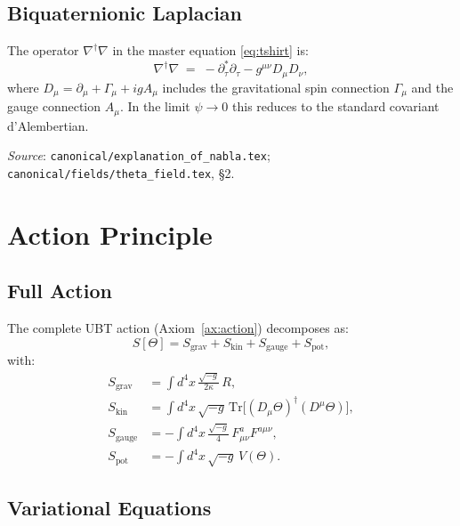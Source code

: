 \documentclass[12pt,a4paper]{article}
\begin{document}
\subsection{Biquaternionic Laplacian}

The operator $\nabla^\dagger\nabla$ in the master equation \eqref{eq:tshirt} is:
\begin{equation}
  \nabla^\dagger\nabla \;=\;
  -\partial_\tau^*\partial_\tau - g^{\mu\nu}D_\mu D_\nu,
\end{equation}
where $D_\mu = \partial_\mu + \Gamma_\mu + igA_\mu$ includes the gravitational
spin connection $\Gamma_\mu$ and the gauge connection $A_\mu$.
In the limit $\psi \to 0$ this reduces to the standard covariant d'Alembertian.

\textit{Source}: \texttt{canonical/explanation\_of\_nabla.tex};
\texttt{canonical/fields/theta\_field.tex}, \S2.

\section{Action Principle}
\label{sec:action}

\subsection{Full Action}

The complete UBT action (Axiom~\ref{ax:action}) decomposes as:
\begin{equation}
  S[\Theta] = S_{\mathrm{grav}} + S_{\mathrm{kin}} + S_{\mathrm{gauge}} + S_{\mathrm{pot}},
\end{equation}
with:
\begin{align}
  S_{\mathrm{grav}} &= \int d^4x\,\frac{\sqrt{-g}}{2\kappa}\,R, \\
  S_{\mathrm{kin}} &= \int d^4x\,\sqrt{-g}\,
    \mathrm{Tr}\bigl[(D_\mu\Theta)^\dagger(D^\mu\Theta)\bigr], \\
  S_{\mathrm{gauge}} &= -\int d^4x\,\frac{\sqrt{-g}}{4}\,F_{\mu\nu}^a F^{a\mu\nu}, \\
  S_{\mathrm{pot}} &= -\int d^4x\,\sqrt{-g}\,V(\Theta).
\end{align}

\subsection{Variational Equations}
\end{document}
